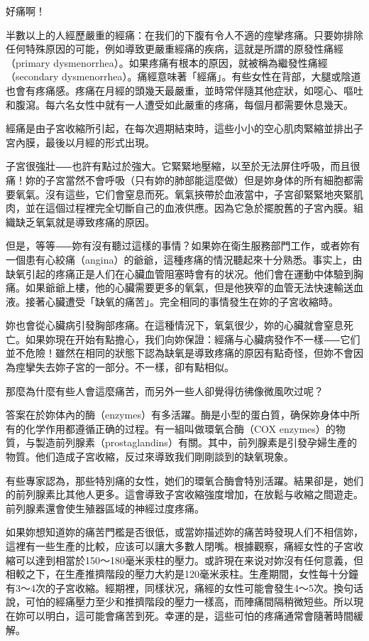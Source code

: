 \documentclass[12pt,UTF8]{ctexbook}
\begin{document}
好痛啊！




半數以上的人經歷嚴重的經痛：在我们的下腹有令人不適的痙攣疼痛。只要妳排除任何特殊原因的可能，例如導致更嚴重經痛的疾病，這就是所謂的原發性痛經（primary dysmenorrhea）。如果疼痛有根本的原因，就被稱為繼發性痛經（secondary dysmenorrhea）。痛經意味著「經痛」。有些女性在背部，大腿或陰道也會有疼痛感。疼痛在月經的頭幾天最嚴重，並時常伴隨其他症狀，如噁心、嘔吐和腹瀉。每六名女性中就有一人遭受如此嚴重的疼痛，每個月都需要休息幾天。

經痛是由子宮收縮所引起，在每次週期結束時，這些小小的空心肌肉緊縮並排出子宮內膜，最後以月經的形式出現。

子宮很強壯⸺也許有點过於強大。它緊緊地壓縮，以至於无法屏住呼吸，而且很痛！妳的子宮當然不會呼吸（只有妳的肺部能這麼做）但是妳身体的所有細胞都需要氧氣。沒有這些，它们會窒息而死。氧氣挾帶於血液當中，子宮卻緊緊地夾緊肌肉，並在這個过程裡完全切斷自己的血液供應。因為它急於擺脫舊的子宮內膜。組織缺乏氧氣就是導致疼痛的原因。

但是，等等⸺妳有沒有聽过這樣的事情？如果妳在衛生服務部門工作，或者妳有一個患有心絞痛（angina）的爺爺，這種疼痛的情況聽起來十分熟悉。事实上，由缺氧引起的疼痛正是人们在心臟血管阻塞時會有的状况。他们會在運動中体驗到胸痛。如果爺爺上樓，他的心臟需要更多的氧氣，但是他狹窄的血管无法快速輸送血液。接著心臟遭受「缺氧的痛苦」。完全相同的事情發生在妳的子宮收縮時。

妳也會從心臟病引發胸部疼痛。在這種情況下，氧氣很少，妳的心臟就會窒息死亡。如果妳現在开始有點擔心，我们向妳保證：經痛与心臟病發作不一樣⸺它们並不危險！雖然在相同的狀態下認為缺氧是導致疼痛的原因有點奇怪，但妳不會因為痙攣失去妳子宮的一部分。不一樣，卻有點相似。

那麼為什麼有些人會這麼痛苦，而另外一些人卻覺得彷彿像微風吹过呢？

答案在於妳体內的酶（enzymes）有多活躍。酶是小型的蛋白質，确保妳身体中所有的化学作用都遵循正确的过程。有一組叫做環氧合酶（COX enzymes）的物質，与製造前列腺素（prostaglandins）有關。其中，前列腺素是引發孕婦生產的物質。他们造成子宮收縮，反过來導致我们剛剛談到的缺氧現象。

有些專家認為，那些特別痛的女性，她们的環氧合酶會特別活躍。結果卻是，她们的前列腺素比其他人更多。這會導致子宮收縮強度增加，在放鬆与收縮之間遊走。前列腺素還會使生殖器區域的神經过度疼痛。

如果妳想知道妳的痛苦門檻是否很低，或當妳描述妳的痛苦時發現人们不相信妳，這裡有一些生產的比較，应该可以讓大多數人閉嘴。根據觀察，痛經女性的子宮收縮可以達到相當於150〜180毫米汞柱的壓力。或許現在来说对妳沒有任何意義，但相較之下，在生產推擠階段的壓力大約是120毫米汞柱。生產期間，女性每十分鐘有3〜4次的子宮收縮。經期裡，同樣状况，痛經的女性可能會發生4〜5次。換句话說，可怕的經痛壓力至少和推擠階段的壓力一樣高，而陣痛間隔稍微短些。所以現在妳可以明白，這可能會痛苦到死。幸運的是，這些可怕的疼痛通常會隨著時間緩解。
\end{document}
